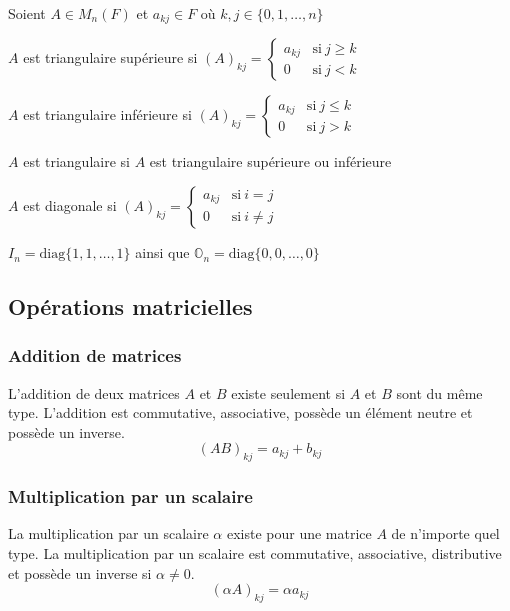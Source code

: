 Soient $A \in M_n(F)$ et $a_{kj} \in F$ où $k, j \in \{0, 1, \dots, n\}$
\begin{definition}
    $A$ est triangulaire supérieure si $(A)_{kj} = \begin{cases}
            a_{kj} & \text{si} \ j \geq k \\
            0      & \text{si} \ j < k
        \end{cases}$
\end{definition}
\begin{definition}
    $A$ est triangulaire inférieure si $(A)_{kj} = \begin{cases}
            a_{kj} & \text{si} \ j \leq k \\
            0      & \text{si} \ j > k
        \end{cases}$
\end{definition}
\begin{note}
    $A$ est triangulaire si $A$ est triangulaire supérieure ou inférieure
\end{note}
\begin{definition}
    $A$ est diagonale si $(A)_{kj} = \begin{cases}
            a_{kj} & \text{si} \ i = j    \\
            0      & \text{si} \ i \neq j
        \end{cases}$
    \begin{remark}
        $I_n = \text{diag}\{ 1, 1, \dots, 1 \}$ ainsi que $\mathbb{O}_n = \text{diag}\{ 0, 0, \dots, 0 \}$
    \end{remark}
\end{definition}


\subsection{Opérations matricielles}

\subsubsection{Addition de matrices}
L'addition de deux matrices $A$ et $B$ existe seulement si $A$ et $B$ sont du même type. L'addition est commutative, associative, possède un élément neutre et possède un inverse.
\[ (AB)_{kj} = a_{kj} + b_{kj} \]

\subsubsection{Multiplication par un scalaire}
La multiplication par un scalaire $\alpha$ existe pour une matrice $A$ de n'importe quel type. La multiplication par un scalaire est commutative, associative, distributive et possède un inverse si $\alpha \neq 0$.
\[ (\alpha A)_{kj} = \alpha a_{kj}\]

